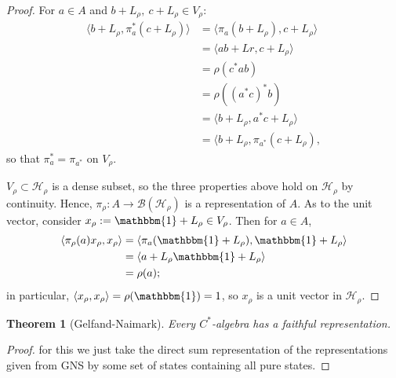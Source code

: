 \documentclass[12pt,a4paper]{amsart}
\theoremstyle{plain}
\newtheorem{thm}{Theorem}
\theoremstyle{definition}
\newcommand{\B}{\mathcal{B}}
\newcommand{\Hr}{\mathcal{H}_\rho}
\newcommand{\1}{\mathbbm{1}}
\newcommand{\Vr}{V_\rho}
\newcommand{\Lr}{L_\rho}
\newcommand{\xr}{x_\rho}
\begin{document}
\begin{proof}
	
	For $a\in A$ and $b+ L_\rho,~c+ L_\rho \in \Vr$:
	\begin{align*}
				\langle b+\Lr, \pi_a^\ast (c+\Lr) \rangle 
		&=		\langle \pi_a (b+\Lr), c+\Lr \rangle						\\
		&=		\langle ab +Lr, c+\Lr \rangle								\\
		&=		\rho(c^\ast ab)												\\
		&=		\rho((a^\ast c)^\ast b)										\\
		&=		\langle b+\Lr, a^\ast c+\Lr \rangle							\\
		&=		\langle b+\Lr, \pi_{a^\ast}(c+\Lr),
	\end{align*}
	so that $ \pi_a^\ast = \pi_{a^\ast}$ on $\Vr$.
	
	$\Vr \subset \Hr$ is a dense subset, so the three properties above hold on 
	$\Hr$ by continuity.  %
	Hence, $\pi_\rho: A \to \B(\Hr)$ is a representation of $A$.
	As to the unit vector, consider $\xr := \1 + \Lr \in \Vr$. Then for $a \in A$,
	\begin{align*}
				\langle \pi_\rho(a)\xr ,\xr \rangle 
		&=		\langle \pi_a(\1+\Lr), \1+\Lr \rangle						\\
		&=		\langle a+\Lr \1+\Lr \rangle								\\
		&=		\rho(a);
	\end{align*}
	in particular, $\langle \xr,\xr \rangle = \rho (\1) = 1$, so $\xr$ is a unit vector in $\Hr$.	
\end{proof}

\begin{thm}[Gelfand-Naimark]
	Every $C^\ast$-algebra has a faithful representation.
\end{thm}
\begin{proof}
	for this we just take the direct sum representation of the representations given from GNS
	by some set of states containing all pure states.
\end{proof}
\end{document}
